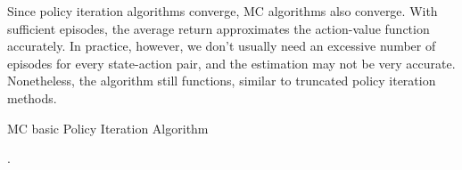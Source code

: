 Since policy iteration algorithms converge, MC algorithms also converge. With sufficient episodes, the average return approximates the
action-value function accurately. In practice, however, we don't usually need an excessive number of episodes for every state-action pair, and
the estimation may not be very accurate. Nonetheless, the algorithm still functions, similar to truncated policy iteration methods.
\begin{algorithm}
	\caption{MC basic Policy Iteration Algorithm}
	.
\end{algorithm}


